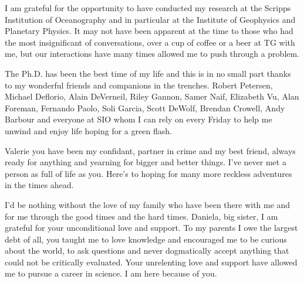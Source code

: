 \begin{frontmatter}
\begin{acknowledgements}
I am grateful for the opportunity to have conducted my research at the Scripps Institution of Oceanography and in particular at the Institute of Geophysics and Planetary Physics. It may not have been apparent at the time to those who had the most insignificant of conversations, over a cup of coffee or a beer at TG with me, but our interactions have many times allowed me to push through a problem.

The Ph.D. has been the best time of my life and this is in no small part thanks to my wonderful friends and companions in the trenches. Robert Petersen, Michael Deflorio, Alain DeVerneil, Riley Gannon, Samer Naif, Elizabeth Vu, Alan Foreman, Fernando Paolo, Soli Garcia, Scott DeWolf, Brendan Crowell, Andy Barbour and everyone at SIO whom I can rely on every Friday to help me unwind and enjoy life hoping for a green flash.

Valerie you have been my confidant, partner in crime and my best friend, always ready for anything and yearning for bigger and better things. I've never met a person as full of life as you. Here's to hoping for many more reckless adventures in the times ahead.

I'd be nothing without the love of my family who have been there with me and for me through the good times and the hard times. Daniela, big sister, I am grateful for your unconditional love and support. To my parents I owe the largest debt of all, you taught me to love knowledge and encouraged me to be curious about the world, to ask questions and never dogmatically accept anything that could not be critically evaluated. Your unrelenting love and support have allowed me to pursue a career in science. I am here because of you.


\end{acknowledgements}
\end{frontmatter}
